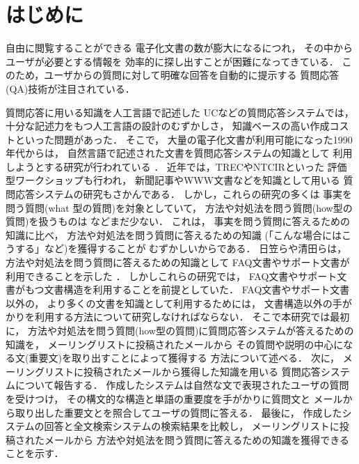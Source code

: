 

\maketitle




 \section{はじめに}

 自由に閲覧することができる
 電子化文書の数が膨大になるにつれ，
 その中からユーザが必要とする情報を
 効率的に探し出すことが困難になってきている．
 このため，ユーザからの質問に対して明確な回答を自動的に提示する
 質問応答(QA)技術が注目されている．

 質問応答に用いる知識を人工言語で記述した
 UC\cite{thesis:wilensky84}などの質問応答システムでは，
 十分な記述力をもつ人工言語の設計のむずかしさ，
 知識ベースの高い作成コストといった問題があった．
 そこで，
 大量の電子化文書が利用可能になった1990年代からは，
 自然言語で記述された文書を質問応答システムの知識として
 利用しようとする研究が行われている
 \cite{proc:hammond95}．
 近年では，TREC\cite{web:TREC}やNTCIR\cite{web:NTCIR}といった
 評価型ワークショップも行われ，
 新聞記事やWWW文書などを知識として用いる
 質問応答システムの研究もさかんである．
 しかし，これらの研究の多くは
 事実を問う質問(what 型の質問)を対象としていて，
 方法や対処法を問う質問(how型の質問)を扱うものは
 \cite{proc:higasa99} \cite{proc:kiyota02}などまだ少ない．
 これは，
 事実を問う質問に答えるための知識に比べ，
 方法や対処法を問う質問に答えるための知識
 (「こんな場合にはこうする」など)を獲得することが
 むずかしいからである．
 日笠らや清田らは，
 方法や対処法を問う質問に答えるための知識として
 FAQ文書やサポート文書が利用できることを示した
 \cite{proc:higasa99}\cite{proc:kiyota02}．
 しかしこれらの研究では，
 FAQ文書やサポート文書がもつ文書構造を利用することを前提としていた．
 FAQ文書やサポート文書以外の，
 より多くの文書を知識として利用するためには，
 文書構造以外の手がかりを利用する方法について研究しなければならない．
 そこで本研究では最初に，
 方法や対処法を問う質問(how型の質問)に質問応答システムが答えるための知識を，
 メーリングリストに投稿されたメールから
 その質問や説明の中心になる文(重要文)を取り出すことによって獲得する
 方法について述べる．
 次に，
 メーリングリストに投稿されたメールから獲得した知識を用いる
 質問応答システムについて報告する．
 作成したシステムは自然な文で表現されたユーザの質問を受けつけ，
 その構文的な構造と単語の重要度を手がかりに質問文と
 メールから取り出した重要文とを照合してユーザの質問に答える．
 最後に，
 作成したシステムの回答と全文検索システムの検索結果を比較し，
 メーリングリストに投稿されたメールから
 方法や対処法を問う質問に答えるための知識を獲得できることを示す．


